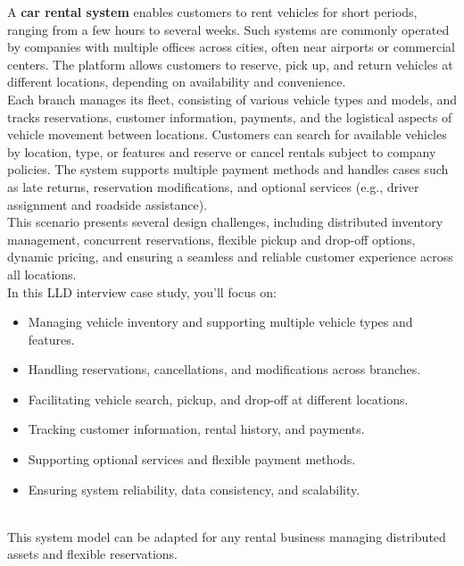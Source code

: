 

A \textbf{car rental system} enables customers to rent vehicles for short periods, ranging from a few hours to several weeks. Such systems are commonly operated by companies with multiple offices across cities, often near airports or commercial centers. The platform allows customers to reserve, pick up, and return vehicles at different locations, depending on availability and convenience.
\\
Each branch manages its fleet, consisting of various vehicle types and models, and tracks reservations, customer information, payments, and the logistical aspects of vehicle movement between locations. Customers can search for available vehicles by location, type, or features and reserve or cancel rentals subject to company policies. The system supports multiple payment methods and handles cases such as late returns, reservation modifications, and optional services (e.g., driver assignment and roadside assistance).
\\
This scenario presents several design challenges, including distributed inventory management, concurrent reservations, flexible pickup and drop-off options, dynamic pricing, and ensuring a seamless and reliable customer experience across all locations.
\\
In this LLD interview case study, you'll focus on:

\begin{itemize}
\item
\protect{}\label{duyeUb8WPc8YPlaGxJaN-}
Managing vehicle inventory and supporting multiple vehicle types and features.
\item
\protect{}\label{nCGNDuXPUg1e7HbDN3kMo}
Handling reservations, cancellations, and modifications across branches.
\item
\protect{}\label{7x7I7CEj7UrA0RDvLtELh}
Facilitating vehicle search, pickup, and drop-off at different locations.
\item
\protect{}\label{Vd0l3X2t4V_rNEvvvszAq}
Tracking customer information, rental history, and payments.
\item
\protect{}\label{uT1QDvsrRd_AxICpB-7My}
Supporting optional services and flexible payment methods.
\item
\protect{}\label{NoptirQn0XvcyPtLgftKH}
Ensuring system reliability, data consistency, and scalability.
\end{itemize}
\\
This system model can be adapted for any rental business managing distributed assets and flexible reservations.

